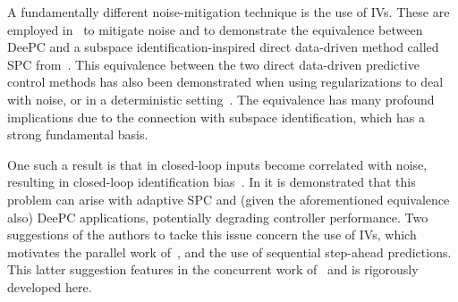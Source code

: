 A fundamentally different noise-mitigation technique is the use of \ac{IVs}. These are employed in~\cite{vanWingerden2022} to mitigate noise and to demonstrate the equivalence between \ac{DeePC} and a subspace identification-inspired direct data-driven method called \ac{SPC} from~\cite{Favoreel1999}. This equivalence between the two direct data-driven predictive control methods has  also been demonstrated when using regularizations to deal with noise, or in a deterministic setting~\citep{Fiedler2021}. The equivalence has many profound implications due to the connection with subspace identification, which has a strong fundamental basis.%
% 

One such a result is that in closed-loop inputs become correlated with noise, resulting in closed-loop identification bias~\citep{Soderstrom1989a}. In \cite{Dinkla2023} it is demonstrated that this problem can arise with adaptive \ac{SPC} and (given the aforementioned equivalence also) \ac{DeePC} applications, potentially degrading controller performance. Two suggestions of the authors to tacke this issue concern the use of \ac{IVs}, which motivates the parallel work of~\cite{Wang2023}, and the use of sequential step-ahead predictions. This latter suggestion features in the concurrent work of~\cite{Shi2023} and is rigorously developed here.

